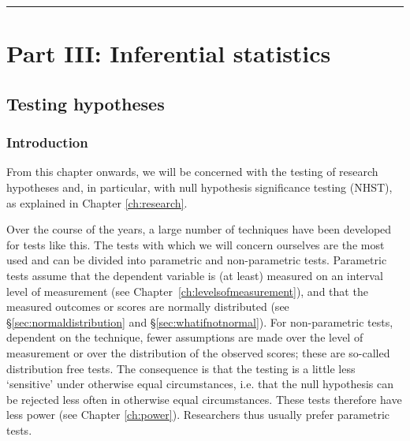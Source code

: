 \documentclass[
]{book}
\begin{document}
\begin{center}\rule{0.5\linewidth}{0.5pt}\end{center}

\hypertarget{part-part-iii-inferential-statistics}{%
\part*{Part III: Inferential statistics}\label{part-part-iii-inferential-statistics}}

\hypertarget{ch:testing}{%
\chapter{Testing hypotheses}\label{ch:testing}}

\hypertarget{sec:testing-introduction}{%
\section{Introduction}\label{sec:testing-introduction}}

From this chapter onwards, we will be concerned with the testing of
research hypotheses and, in particular, with null hypothesis significance testing (NHST),
as explained in Chapter \ref{ch:research}.

Over the course of the years, a large number of techniques have been developed
for tests like this. The tests with which we will concern ourselves
are the most used and can be divided into parametric
and non-parametric tests. Parametric tests assume that the dependent
variable is (at least) measured on an interval level of measurement (see
Chapter~\ref{ch:levelsofmeasurement}), and that the measured outcomes or
scores are normally distributed (see
§\ref{sec:normaldistribution} and §\ref{sec:whatifnotnormal}).
For non-parametric tests, dependent on the technique,
fewer assumptions are made over the level of measurement or over
the distribution of the observed scores; these are so-called
distribution free tests. The consequence is that the testing
is a little less `sensitive' under otherwise equal circumstances, i.e.
that the null hypothesis can be rejected less often in
otherwise equal circumstances. These tests therefore have less power (see
Chapter \ref{ch:power}). Researchers thus usually prefer parametric
tests.
\end{document}
